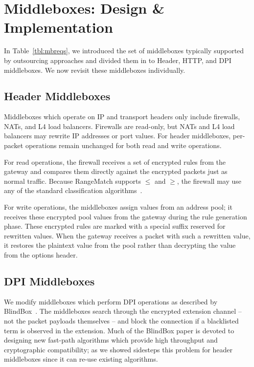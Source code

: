 \section{Middleboxes: Design \& Implementation}
\label{sec:mbs}

In Table~\ref{tbl:mbreqs}, we introduced the set of middleboxes typically supported by outsourcing approaches and divided them in to Header, HTTP, and DPI middleboxes. 
We now revisit these middleboxes individually. %

\subsection{Header Middleboxes}
Middleboxes which operate on IP and transport headers only include firewalls, NATs, and L4 load balancers.
Firewalls are read-only, but NATs and L4 load balancers may rewrite IP addresses or port values. 
For header middleboxes, per-packet operations remain unchanged for both read and write operations.

For read operations, the firewall receives a set of encrypted rules from the gateway and compares them directly against the encrypted packets just as normal traffic. Because RangeMatch supports $\leq$ and $\geq$, the firewall may use any of the standard classification algorithms~\cite{packet_classif}.

For write operations, the middleboxes assign values from an address pool; it receives these encrypted pool values from the gateway during the rule generation phase.
These encrypted rules are marked with a special suffix reserved for rewritten values.
When the gateway receives a packet with such a rewritten value, it restores the plaintext value from the pool rather than decrypting the value from the options header.

\subsection{DPI Middleboxes}
We modify middleboxes which perform DPI operations as described by BlindBox~\cite{blindbox}. 
The middleboxes search through the encrypted extension channel -- not the packet payloads themselves -- and block the connection if a blacklisted term is observed in the extension.
Much of the BlindBox paper is devoted to designing new fast-path algorithms which provide high throughput and cryptographic compatibility; as we showed \sys sidesteps this problem for header middleboxes since it can re-use existing algorithms.

